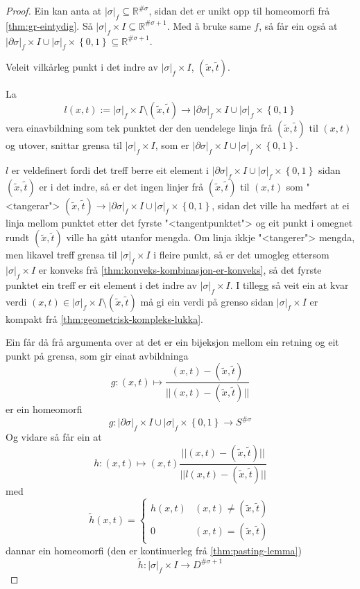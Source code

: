\documentclass[a4paper, 12pt, norsk]{article}
\theoremstyle{plain}
\theoremstyle{definition}
\newcommand{\Rb}{\mathbb{R}}
\newcommand{\union}{ \mathop{\cup}\limits }
\newcommand{\gr}[1]{ \lvert #1 \rvert } %
\newcommand{\set}[1]{ \left\{ #1 \right\} } %
\newcommand{\tuple}[1]{ \left( #1 \right) } %
\begin{document}
\begin{proof}
	Ein kan anta at \( \gr{\sigma}_f \subseteq \Rb^{\#\sigma} \), sidan det er unikt opp til homeomorfi frå \autoref{thm:gr-eintydig}. Så \( \gr{\sigma}_f \times I \subseteq \Rb^{\#\sigma+1} \). Med å bruke same \( f \), så får ein også at \( \gr{\partial\sigma}_f \times I \union \gr{\sigma}_f \times \set{0, 1} \subseteq \Rb^{\#\sigma+1} \).

	Veleit vilkårleg punkt i det indre av \( \gr{\sigma}_f \times I \), \( \tuple{\tilde{x}, \tilde{t}} \). 
	
	La
	\[
		l(x,t) := \gr{\sigma}_f \times I \setminus \tuple{\tilde{x}, \tilde{t}} \to \gr{\partial\sigma}_f \times I \union \gr{\sigma}_f \times \set{0, 1}
	\] 
	vera einavbildning som tek punktet der den uendelege linja frå \( \tuple{\tilde{x}, \tilde{t}} \) til \( \tuple{x,t} \) og utover, snittar grensa til \( \gr{\sigma}_f \times I \), som er \( \gr{\partial\sigma}_f \times I \union \gr{\sigma}_f \times \set{0, 1} \).

	\( l \) er veldefinert fordi det treff berre eit element i \( \gr{\partial\sigma}_f \times I \union \gr{\sigma}_f \times \set{0, 1} \) sidan \( \tuple{\tilde{x}, \tilde{t}} \) er i det indre, så er det ingen linjer frå \( \tuple{\tilde{x}, \tilde{t}} \) til \( \tuple{x,t} \) som "<tangerar"> \( \tuple{\tilde{x}, \tilde{t}} \to \gr{\partial\sigma}_f \times I \union \gr{\sigma}_f \times \set{0, 1} \), sidan det ville ha medført at ei linja mellom punktet etter det fyrste "<tangentpunktet"> og eit punkt i omegnet rundt \( \tuple{\tilde{x}, \tilde{t}} \) ville ha gått utanfor mengda. Om linja ikkje "<tangerer"> mengda, men likavel treff grensa til \( \gr{\sigma}_f \times I \) i fleire punkt, så er det umogleg ettersom \( \gr{\sigma}_f \times I \) er konveks frå \autoref{thm:konveks-kombinasjon-er-konveks}, så det fyrste punktet ein treff er eit element i det indre av \( \gr{\sigma}_f \times I \). I tillegg så veit ein at kvar verdi \( (x,t) \in \gr{\sigma}_f \times I \setminus \tuple{\tilde{x}, \tilde{t}} \) må gi ein verdi på grenso sidan \( \gr{\sigma}_f \times I \) er kompakt frå \autoref{thm:geometrisk-kompleks-lukka}.

	Ein får då frå argumenta over at det er ein bijeksjon mellom ein retning og eit punkt på grensa, som gir einat avbildninga
	\[
		g: (x, t) \mapsto \frac{(x,t)-(\tilde{x},\tilde{t})}{||(x,t)-(\tilde{x},\tilde{t})||}
	\]
	er ein homeomorfi
	\[
		g: \gr{\partial\sigma}_f \times I \union \gr{\sigma}_f \times \set{0, 1} \to S^{\#\sigma}
	\]
	Og vidare så får ein at
	\[
		h:(x, t) \mapsto \tuple{x, t}\frac{||(x,t) - (\tilde{x}, \tilde{t})||}{||l(x,t)-(\tilde{x}, \tilde{t})||}
	\]
	med
	\[
		\tilde{h}(x,t) =
		\begin{cases}
			h(x,t) & (x, t) \neq (\tilde{x}, \tilde{t}) \\
			0 & (x, t) = (\tilde{x}, \tilde{t})
		\end{cases}
	\]
	dannar ein homeomorfi (den er kontinuerleg frå \autoref{thm:pasting-lemma})
	\[
		\tilde{h}: \gr{\sigma}_f \times I \to D^{\#\sigma+1}
	\]
\end{proof}
\end{document}
